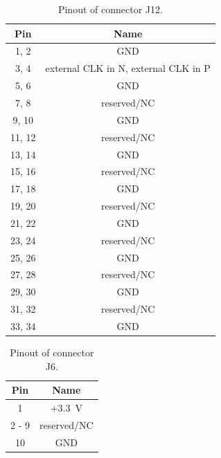     \begin{table}
    \begin{small}
        \centering
            \begin{tabular}{|c|c|}
                \hline
                Pin & Name\\
                \hline\hline
                1, 2 & GND\\
                \hline
                3, 4 & external CLK in N, external CLK in P\\
                \hline
                5, 6 & GND\\
                \hline
                7, 8 & reserved/NC\\
                \hline
                9, 10 & GND\\
                \hline
                11, 12 & reserved/NC\\
                \hline
                13, 14 & GND\\
                \hline
                15, 16 & reserved/NC\\
                \hline
                17, 18 & GND\\
                \hline
                19, 20 & reserved/NC\\
                \hline
                21, 22 & GND\\
                \hline
                23, 24 & reserved/NC\\
                \hline
                25, 26 & GND\\
                \hline
                27, 28 & reserved/NC\\
                \hline
                29, 30 & GND\\
                \hline
                31, 32 & reserved/NC\\
                \hline
                33, 34 & GND\\
                \hline
            \end{tabular}
            \caption{Pinout of connector J12.}
            \label{J12}
    \end{small}
    \end{table}

    \begin{table}
    \begin{small}
        \centering
            \begin{tabular}{|c|c|}
                \hline
                Pin & Name\\
                \hline\hline
                1 & +\SI{3.3}{\volt}\\
                \hline
                2 - 9 & reserved/NC\\
                \hline
                10 & GND\\
                \hline
            \end{tabular}
            \caption{Pinout of connector J6.}
            \label{J6}
    \end{small}
    \end{table}

